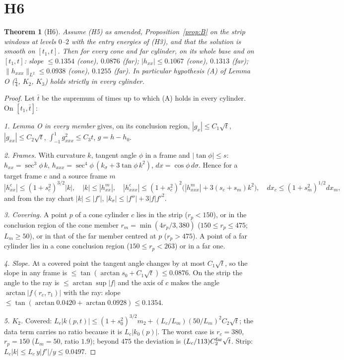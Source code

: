 \documentclass[10pt]{article}
\newtheorem{theorem}{Theorem}\newtheorem{proposition}[theorem]{Proposition}\newtheorem{lemma}[theorem]{Lemma}
\begin{document}
\section{H6}\label{sec:H6}
\begin{theorem}[H6]\label{thm:H6}
Assume (H5) as amended, Proposition~\ref{prop:B} on the strip windows at levels $0$--$2$ with the entry energies of (H3), and that the solution is smooth on $[t_1,t]$. Then for every cone and far cylinder, on its whole base and on $[t_1,t]$: slope $\le0.1354$ (cone), $0.0876$ (far); $|h_{xx}|\le0.1067$ (cone), $0.1313$ (far); $\|h_{xxx}\|_{L^2}\le0.0938$ (cone), $0.1255$ (far). In particular hypothesis (A) of Lemma O ($\tfrac14$, $K_2$, $K_3$) holds strictly in every cylinder.
\end{theorem}
\begin{proof}
Let $\bar t$ be the supremum of times up to which (A) holds in every cylinder. On $[t_1,\bar t]$:

\emph{1. Lemma O in every member} gives, on its conclusion region, $|g_x|\le C_1\sqrt t$, $|g_{xx}|\le C_2\sqrt t$, $\int_{-1}^1g_{xxx}^2\le C_3t$, $g=h-h_0$.

\emph{2. Frames.} With curvature $k$, tangent angle $\phi$ in a frame and $|\tan\phi|\le s$: $h_{xx}=\sec^3\!\phi\,k$, $h_{xxx}=\sec^4\!\phi\,(k_\sigma+3\tan\phi\,k^2)$, $dx=\cos\phi\,d\sigma$. Hence for a target frame $c$ and a source frame $m$
\[|h^c_{xx}|\le(1+s_c^2)^{3/2}|k|,\quad|k|\le|h^m_{xx}|,\quad|h^c_{xxx}|\le(1+s_c^2)^2\bigl(|h^m_{xxx}|+3(s_c+s_m)k^2\bigr),\quad dx_c\le(1+s_m^2)^{1/2}dx_m,\]
and from the ray chart $|k|\le|f'|$, $|k_\sigma|\le|f''|+3|f|f'^2$.

\emph{3. Covering.} A point $p$ of a cone cylinder $c$ lies in the strip ($r_p<150$), or in the conclusion region of the cone member $r_m=\min(4r_p/3,380)$ ($150\le r_p\le475$; $L_m\ge50$), or in that of the far member centred at $p$ ($r_p>475$). A point of a far cylinder lies in a cone conclusion region ($150\le r_p<263$) or in a far one.

\emph{4. Slope.} At a covered point the tangent angle changes by at most $C_1\sqrt t$, so the slope in any frame is $\le\tan(\arctan s_0+C_1\sqrt t)\le0.0876$. On the strip the angle to the ray is $\le\arctan\sup|f|$ and the axis of $c$ makes the angle $\arctan|f(r_c,\tau_1)|$ with the ray: slope $\le\tan(\arctan0.0420+\arctan0.0928)\le0.1354$.

\emph{5. $K_2$.} Covered: $L_c|k(p,t)|\le(1+s_0^2)^{3/2}m_2+(L_c/L_m)(50/L_m)^2C_2\sqrt t$; the data term carries no ratio because it is $L_c|k_0(p)|$. The worst case is $r_c=380$, $r_p=150$ ($L_m=50$, ratio $1.9$); beyond $475$ the deviation is $(L_c/113)C_2^{\rm far}\sqrt t$. Strip: $L_c|k|\le L_c\,y|f'|/y\le0.0497$.


\end{proof}
\end{document}

